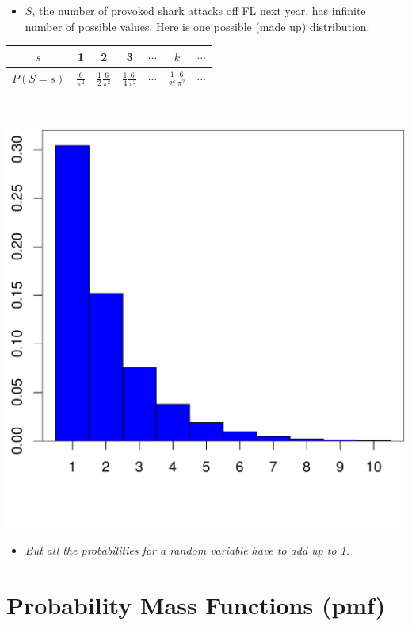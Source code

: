 \documentclass[handout]{beamer}\usepackage[]{graphicx}\usepackage[]{color}
\newenvironment{knitrout}{}{} %
\providecommand{\q}{$\quad$ \newline}
\numberwithin{equation}{section}
\begin{document}
\begin{frame}
\begin{itemize}
\item $S$, the number of provoked shark attacks off FL next year, has infinite number of possible values. Here is one possible (made up) distribution: \q \q
\end{itemize}
\begin{tabular}{ccccccc}
$s$ & 1 & 2 & 3 & $\cdots$ & $k$ & $\cdots$ \\ \hline
$P(S = s)$ & $\frac{6}{\pi^2}$ & $\frac{1}{2} \frac{6}{\pi^2}$ & $\frac{1}{4} \frac{6}{\pi^2}$ & $\cdots$ & $\frac{1}{2^k} \frac{6}{\pi^2}$ & $\cdots$ \\ 
\end{tabular}\q

\begin{center}
\begin{knitrout}
\color{fgcolor}
\includegraphics[width=.6\textwidth,height=.6\textheight]{figure/unnamed-chunk-4-1} 

\end{knitrout}
\end{center}
\begin{itemize}
\item \emph{But all the probabilities for a random variable have to add up to 1.}
\end{itemize}
\end{frame}

\section{Probability Mass Functions (pmf)}
\end{document}
